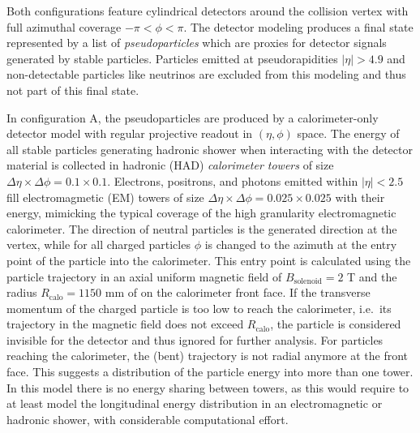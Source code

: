 \documentclass[11pt,letterpaper]{article}
\begin{document}
Both configurations feature cylindrical detectors around the collision vertex with full azimuthal coverage $-\pi < \phi < \pi$.
The detector modeling produces a final state represented by a list of \emph{pseudoparticles} which are proxies for detector signals generated by stable particles.
Particles emitted at pseudorapidities $|\eta| > 4.9$ and non-detectable particles like neutrinos are excluded from this modeling and thus not part of this final state. 

In configuration A, the pseudoparticles are produced by a calorimeter-only detector model with regular projective readout in $(\eta,\phi)$ space. 
The energy of all stable particles generating hadronic shower when interacting with the detector material is collected 
in hadronic (HAD) \emph{calorimeter towers} of size $\Delta\eta\times\Delta\phi = 0.1\times0.1$. 
Electrons, positrons, and photons emitted within $|\eta| < 2.5$ fill electromagmetic (EM) towers of size $\Delta\eta\times\Delta\phi = 0.025\times0.025$ with their energy, mimicking the typical
coverage of the high granularity electromagnetic calorimeter. 
The direction of neutral particles is the generated direction at the vertex, while for all charged particles $\phi$ is changed to the azimuth at the entry point of the particle
into the calorimeter. 
This entry point is calculated using the particle trajectory in an axial uniform magnetic field of $B_{\text{solenoid}} = 2$%
 T and the radius $R_{\text{calo}} = 1150$ mm of
on the calorimeter front face.
If the transverse momentum of the charged particle  is too low to reach the calorimeter, i.e.\ its trajectory in the magnetic field does not exceed $R_{\text{calo}}$, 
the particle is considered invisible for the detector and thus ignored for further analysis.   
For particles reaching the calorimeter, the (bent) trajectory is not radial anymore at the front face.
This suggests a distribution of the particle energy into more than one tower.
In this model there is no energy sharing between towers, as this would require to at least model the longitudinal energy distribution in an electromagnetic or hadronic shower, with considerable computational effort.
\end{document}
